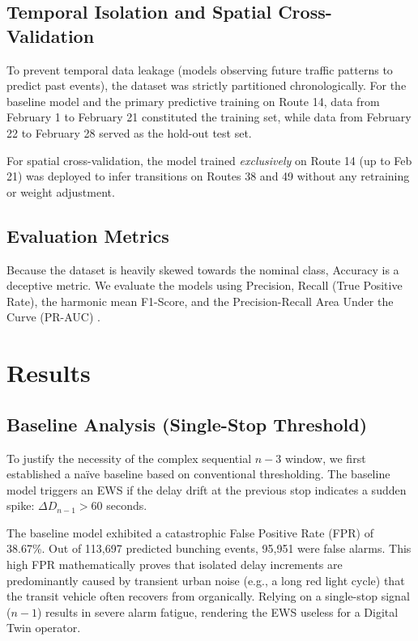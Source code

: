 \documentclass[journal,twocolumn]{IEEEtran}
\begin{document}
\subsection{Temporal Isolation and Spatial Cross-Validation}
To prevent temporal data leakage (models observing future traffic patterns to predict past events), the dataset was strictly partitioned chronologically. For the baseline model and the primary predictive training on Route 14, data from February 1 to February 21 constituted the training set, while data from February 22 to February 28 served as the hold-out test set.

For spatial cross-validation, the model trained \textit{exclusively} on Route 14 (up to Feb 21) was deployed to infer transitions on Routes 38 and 49 without any retraining or weight adjustment.

\subsection{Evaluation Metrics}
Because the dataset is heavily skewed towards the nominal class, Accuracy is a deceptive metric. We evaluate the models using Precision, Recall (True Positive Rate), the harmonic mean F1-Score, and the Precision-Recall Area Under the Curve (PR-AUC) \cite{17}.

\section{Results}

\subsection{Baseline Analysis (Single-Stop Threshold)}
To justify the necessity of the complex sequential $n-3$ window, we first established a naïve baseline based on conventional thresholding. The baseline model triggers an EWS if the delay drift at the previous stop indicates a sudden spike: $\Delta D_{n-1} > 60$ seconds.

The baseline model exhibited a catastrophic False Positive Rate (FPR) of 38.67\%. Out of 113,697 predicted bunching events, 95,951 were false alarms. This high FPR mathematically proves that isolated delay increments are predominantly caused by transient urban noise (e.g., a long red light cycle) that the transit vehicle often recovers from organically. Relying on a single-stop signal ($n-1$) results in severe alarm fatigue, rendering the EWS useless for a Digital Twin operator.
\end{document}

